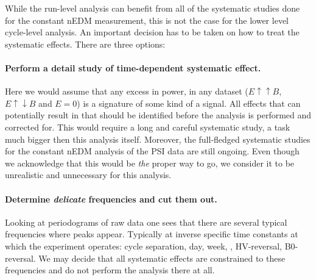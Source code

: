 While the run-level analysis can benefit from all of the systematic studies done for the constant nEDM measurement, this is not the case for the lower level cycle-level analysis. An important decision has to be taken on how to treat the systematic effects. There are three options:

\paragraph{Perform a detail study of time-dependent systematic effect.}
Here we would assume that any excess in power, in any dataset ($E \uparrow \uparrow B$, $E \uparrow \downarrow B$ and $E=0$) is a signature of some kind of a signal. All effects that can potentially result in that should be identified before the analysis is performed and corrected for. This would require a long and careful systematic study, a task much bigger then this analysis itself. Moreover, the full-fledged systematic studies for the constant nEDM analysis of the PSI data are still ongoing. Even though we acknowledge that this would be \emph{the} proper way to go, we consider it to be unrealistic and unnecessary for this analysis.

\paragraph{Determine \emph{delicate} frequencies and cut them out.}
Looking at periodograms of raw data one sees that there are several typical frequencies where peaks appear. Typically at inverse specific time constants at which the experiment operates: cycle separation, day, week, , HV-reversal, B0-reversal. We may decide that all systematic effects are constrained to these frequencies and do not perform the analysis there at all.

